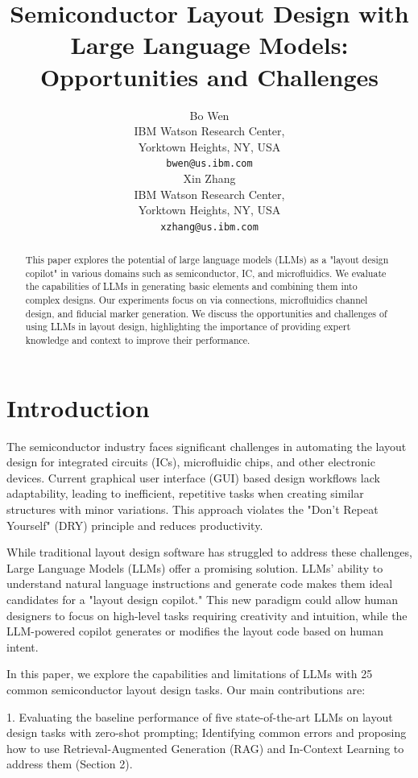 \documentclass{article}
\title{Semiconductor Layout Design with Large Language Models: Opportunities and Challenges}
\author{%
  Bo Wen\\
  IBM Watson Research Center, \\
  Yorktown Heights, NY, USA \\
  \texttt{bwen@us.ibm.com} \\
  \And
  Xin Zhang\\
  IBM Watson Research Center, \\
  Yorktown Heights, NY, USA \\
  \texttt{xzhang@us.ibm.com} \\
}
\begin{document}
\maketitle

\begin{abstract}
  This paper explores the potential of large language models (LLMs) as a "layout design copilot" in various domains such as semiconductor, IC, and microfluidics. We evaluate the capabilities of LLMs in generating basic elements and combining them into complex designs. Our experiments focus on via connections, microfluidics channel design, and fiducial marker generation. We discuss the opportunities and challenges of using LLMs in layout design, highlighting the importance of providing expert knowledge and context to improve their performance.
\end{abstract}

\section{Introduction}
The semiconductor industry faces significant challenges in automating the layout design for integrated circuits (ICs), microfluidic chips, and other electronic devices. Current graphical user interface (GUI) based design workflows lack adaptability, leading to inefficient, repetitive tasks when creating similar structures with minor variations. This approach violates the "Don't Repeat Yourself" (DRY) principle and reduces productivity.

While traditional layout design software has struggled to address these challenges, Large Language Models (LLMs) offer a promising solution. LLMs' ability to understand natural language instructions and generate code makes them ideal candidates for a "layout design copilot." This new paradigm could allow human designers to focus on high-level tasks requiring creativity and intuition, while the LLM-powered copilot generates or modifies the layout code based on human intent.

In this paper, we explore the capabilities and limitations of LLMs with 25 common semiconductor layout design tasks. Our main contributions are:

1. Evaluating the baseline performance of five state-of-the-art LLMs on layout design tasks with zero-shot prompting; Identifying common errors and proposing how to use Retrieval-Augmented Generation (RAG) and In-Context Learning to address them (Section 2).
\end{document}

